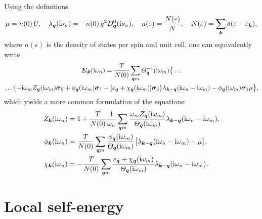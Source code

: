 Using the definitions \cite{MargineGiustino13}
%
\begin{align*}
    \mu = n(0) \, U,
        \quad
    \lambda_{\boldsymbol q}(\mathrm i \nu_n) = -n(0) \, g^2 D_{\boldsymbol q}^0(\mathrm i \nu_n),
        \quad
    n(\varepsilon) = \frac{N(\varepsilon)} N,
        \quad
    N(\varepsilon) = \sum_{\boldsymbol k} \delta(\varepsilon - \varepsilon_{\boldsymbol k}),
\end{align*}
%
where $n(\epsilon)$ is the density of states per spin and unit cell, one can
equivalently write
%
\begin{multline*}
    \boldsymbol {\varSigma}_{\boldsymbol k} (\mathrm i \omega_n)
    = \frac T {N(0)} \sum_{\boldsymbol q m}
    \varTheta_{\boldsymbol q}^{-1}(\mathrm i \omega_m) \big \{ \dots
        \\
        \dots \{
            - \mathrm i \omega_m Z_{\boldsymbol q}(\mathrm i \omega_m) \boldsymbol \sigma_0
            + \phi_{\boldsymbol q}(\mathrm i \omega_m) \boldsymbol \sigma_1
            - [\varepsilon_{\boldsymbol q} + \chi_{\boldsymbol q}(\mathrm i \omega_m)] \boldsymbol \sigma_3
            \}
        \lambda_{\boldsymbol k - \boldsymbol q}(\mathrm i \omega_n - \mathrm i \omega_m)
        - \phi_{\boldsymbol q}(\mathrm i \omega_m) \boldsymbol \sigma_1 \mu
    \big \},
\end{multline*}
%
which yields a more common formulation of the  equations:
%
\begin{subequations}
    \begin{align}
        Z_{\boldsymbol k}(\mathrm i \omega_n) &= 1 + \frac T {N(0)} \frac 1 {\omega_n}
        \sum_{\boldsymbol q m} \frac
            {\omega_m Z_{\boldsymbol q}(\mathrm i \omega_m)}
            {\varTheta_{\boldsymbol q}(\mathrm i \omega_m)}
        \lambda_{\boldsymbol k - \boldsymbol q}(\mathrm i \omega_n - \mathrm i \omega_m),
        \\
        \phi_{\boldsymbol k}(\mathrm i \omega_n) &= \frac T {N(0)}
        \sum_{\boldsymbol q m} \frac
            {\phi_{\boldsymbol q}(\mathrm i \omega_m)}
            {\varTheta_{\boldsymbol q}(\mathrm i \omega_m)}
        \big[ \lambda_{\boldsymbol k - \boldsymbol q}(\mathrm i \omega_n - \mathrm i \omega_m) - \mu \big],
        \\
        \chi_{\boldsymbol k}(\mathrm i \omega_n) &= -\frac T {N(0)}
        \sum_{\boldsymbol q m} \frac
            {\varepsilon_{\boldsymbol q} + \chi_{\boldsymbol q}(\mathrm i \omega_m)}
            {\varTheta_{\boldsymbol q}(\mathrm i \omega_m)}
        \lambda_{\boldsymbol k - \boldsymbol q}(\mathrm i \omega_n - \mathrm i \omega_m).
    \end{align}
\end{subequations}

\section{Local self-energy}

